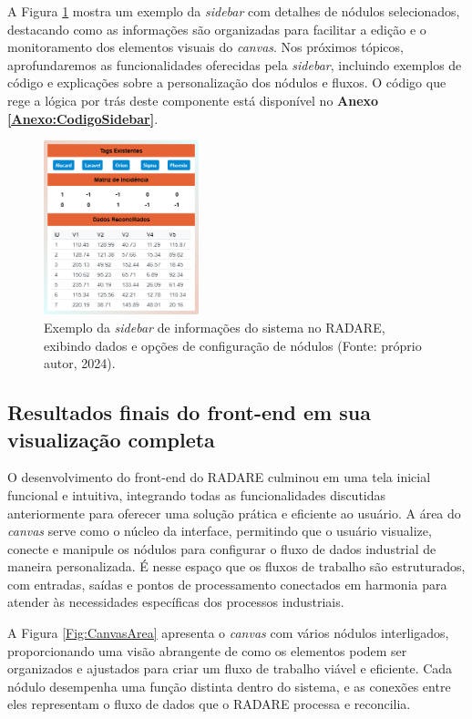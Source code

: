 A Figura \ref{Fig:SidebarInterface} mostra um exemplo da \textit{sidebar} com detalhes de nódulos selecionados, destacando como as informações são organizadas para facilitar a edição e o monitoramento dos elementos visuais do \textit{canvas}. Nos próximos tópicos, aprofundaremos as funcionalidades oferecidas pela \textit{sidebar}, incluindo exemplos de código e explicações sobre a personalização dos nódulos e fluxos. O código que rege a lógica por trás deste componente está disponível no \textbf{Anexo \ref{Anexo:CodigoSidebar}}.

\begin{figure}[htbp]
    \centering
    \includegraphics[width=0.4\textwidth]{figuras/interface-sidebar.png}
    \caption{Exemplo da \textit{sidebar} de informações do sistema no RADARE, exibindo dados e opções de configuração de nódulos (Fonte: próprio autor, 2024).}
    \label{Fig:SidebarInterface}
\end{figure}

\subsection{Resultados finais do front-end em sua visualização completa}

O desenvolvimento do front-end do RADARE culminou em uma tela inicial funcional e intuitiva, integrando todas as funcionalidades discutidas anteriormente para oferecer uma solução prática e eficiente ao usuário. A área do \textit{canvas} serve como o núcleo da interface, permitindo que o usuário visualize, conecte e manipule os nódulos para configurar o fluxo de dados industrial de maneira personalizada. É nesse espaço que os fluxos de trabalho são estruturados, com entradas, saídas e pontos de processamento conectados em harmonia para atender às necessidades específicas dos processos industriais.

A Figura \ref{Fig:CanvasArea} apresenta o \textit{canvas} com vários nódulos interligados, proporcionando uma visão abrangente de como os elementos podem ser organizados e ajustados para criar um fluxo de trabalho viável e eficiente. Cada nódulo desempenha uma função distinta dentro do sistema, e as conexões entre eles representam o fluxo de dados que o RADARE processa e reconcilia. 

